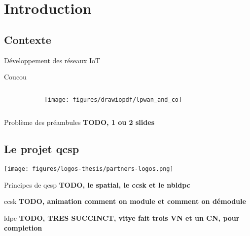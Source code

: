 \documentclass[../main.tex]{subfiles}
\begin{document}
\section{Introduction}

\subsection{Contexte}

\begin{frame}{Développement des réseaux IoT}
  \begin{overlayarea}{\linewidth}{.2\textheight}
    Coucou
  \end{overlayarea}
  
  \begin{columns}
    \begin{column}{.3\linewidth}
      \hfill
    \end{column}
    \begin{column}{.6\linewidth} \centering
      \texttt{[image: figures/drawiopdf/lpwan\_and\_co]}
    \end{column}
    \begin{column}{.1\linewidth}
      \hfill
    \end{column}
  \end{columns}
\end{frame}


\begin{frame}{Problème des préambules}
  \textbf{TODO, 1 ou 2 slides}
\end{frame}


\subsection[Le projet \acrshort{qcsp}]{Le projet \acrfull{qcsp}}

\begin{frame}{\subsecname}{}
  \begin{center}
    \texttt{[image: figures/logos-thesis/partners-logos.png]}
  \end{center}
\end{frame}

\begin{frame}{Principes de \acrshort{qcsp}}
  \textbf{TODO, le spatial, le ccsk et le nbldpc}
\end{frame}

\begin{frame}{\acrfull{ccsk}}
  \textbf{TODO, animation comment on module et comment on démodule}
\end{frame}

\begin{frame}{\acrfull{ldpc}}
  \textbf{TODO, TRES SUCCINCT, vitye fait trois VN et un CN, pour completion}
\end{frame}
\end{document}
